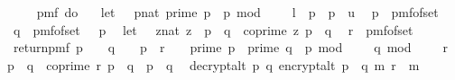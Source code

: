 \begin{isabellebody}
\ \ {\isacharequal}{\kern0pt}\ \isanewline
\ \ pmf\ {\isacharparenleft}{\kern0pt}do\ {\isacharbraceleft}{\kern0pt}\isanewline
\ \ let\ {\isasymK}\ {\isacharequal}{\kern0pt}\ {\isacharbraceleft}{\kern0pt}{\isacharparenleft}{\kern0pt}p{\isacharcolon}{\kern0pt}{\isacharcolon}{\kern0pt}nat{\isacharparenright}{\kern0pt}{\isachardot}{\kern0pt}\ prime\ p\ {\isasymand}\ p\ mod\ {}\ {\isacharequal}{\kern0pt}\ {}\ {\isasymand}\ l\ {\isasymle}\ p\ {\isasymand}\ p\ {\isasymle}\ u{\isacharbraceright}{\kern0pt}{\isacharsemicolon}{\kern0pt}\isanewline
\ \ p\ {\isasymleftarrow}\ pmf{\isacharunderscore}{\kern0pt}of{\isacharunderscore}{\kern0pt}set\ {\isasymK}{\isacharsemicolon}{\kern0pt}\ \isanewline
\ \ q\ {\isasymleftarrow}\ pmf{\isacharunderscore}{\kern0pt}of{\isacharunderscore}{\kern0pt}set\ {\isacharparenleft}{\kern0pt}{\isasymK}\ {\isacharminus}{\kern0pt}\ {\isacharbraceleft}{\kern0pt}p{\isacharbraceright}{\kern0pt}{\isacharparenright}{\kern0pt}{\isacharsemicolon}{\kern0pt}\isanewline
\ \ let\ {\isasymZ}\ {\isacharequal}{\kern0pt}\ {\isacharbraceleft}{\kern0pt}{\isacharparenleft}{\kern0pt}z{\isacharcolon}{\kern0pt}{\isacharcolon}{\kern0pt}nat{\isacharparenright}{\kern0pt}{\isachardot}{\kern0pt}\ z\ {\isacharless}{\kern0pt}\ p\ {\isacharasterisk}{\kern0pt}\ q\ {\isasymand}\ coprime\ z\ {\isacharparenleft}{\kern0pt}p\ {\isacharasterisk}{\kern0pt}\ q{\isacharparenright}{\kern0pt}{\isacharbraceright}{\kern0pt}{\isacharsemicolon}{\kern0pt}\isanewline
\ \ r\ {\isasymleftarrow}\ pmf{\isacharunderscore}{\kern0pt}of{\isacharunderscore}{\kern0pt}set\ {\isasymZ}{\isacharsemicolon}{\kern0pt}\isanewline
\ \ return{\isacharunderscore}{\kern0pt}pmf\ {\isacharparenleft}{\kern0pt}{\isacharparenleft}{\kern0pt}{\isacharparenleft}{\kern0pt}{\isasymnot}{\isacharparenleft}{\kern0pt}p\ {\isasymin}\ {\isasymK}\ {\isasymand}\ q\ {\isasymin}\ {\isasymK}\ {\isacharminus}{\kern0pt}\ {\isacharbraceleft}{\kern0pt}p{\isacharbraceright}{\kern0pt}\ {\isasymand}\ r\ {\isasymin}\ {\isasymZ}{\isacharparenright}{\kern0pt}\ {\isasymlongrightarrow}\ prime\ p\ {\isasymand}\ prime\ q\ {\isasymand}\ p\ mod\ {}\ {\isacharequal}{\kern0pt}\ {}\ {\isasymand}\ q\ mod\ {}\ {\isacharequal}{\kern0pt}\ {}\ {\isasymand}\ r\ {\isacharless}{\kern0pt}\ p\ {\isacharasterisk}{\kern0pt}\ q\ {\isasymand}\ coprime\ r\ {\isacharparenleft}{\kern0pt}p\ {\isacharasterisk}{\kern0pt}\ q{\isacharparenright}{\kern0pt}\ {\isasymand}\ p\ {\isasymnoteq}\ q{\isacharparenright}{\kern0pt}{\isacharparenright}{\kern0pt}\isanewline
\ {\isasymor}\ decrypt{\isacharunderscore}{\kern0pt}alt\ p\ q\ {\isacharparenleft}{\kern0pt}encrypt{\isacharunderscore}{\kern0pt}alt\ {\isacharparenleft}{\kern0pt}p\ {\isacharasterisk}{\kern0pt}\ q{\isacharparenright}{\kern0pt}\ m\ r{\isacharparenright}{\kern0pt}\ {\isacharequal}{\kern0pt}\ m{\isacharparenright}{\kern0pt}{\isacharbraceright}{\kern0pt}{\isacharparenright}{\kern0pt}\isanewline

\end{isabellebody}
